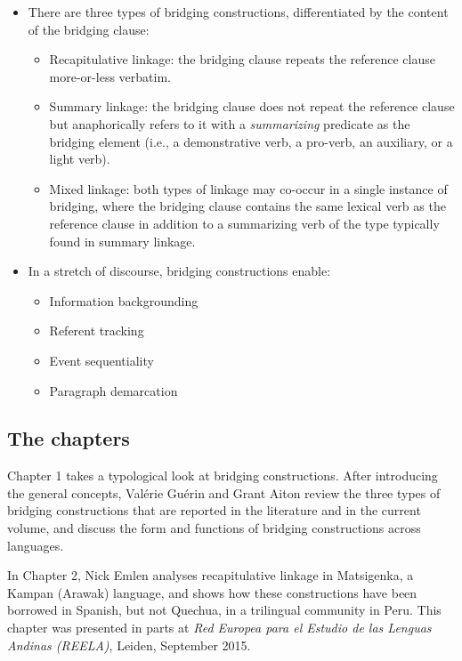 \begin{refsection}
 \begin{itemize}  
\item There are three types of bridging constructions, differentiated by the content of the bridging clause: 
\begin{itemize}
\item Recapitulative linkage: the bridging clause repeats the reference clause more-or-less verbatim. 
\item  Summary linkage: the bridging clause does not repeat the reference clause but anaphorically refers to it with a \textit{summarizing} predicate as the bridging element (i.e., a demonstrative verb, a pro-verb, an auxiliary, or a light verb). 
\item Mixed linkage: both types of linkage may co-occur in a single instance of bridging, where the bridging clause contains the same lexical verb as the reference clause in addition to a summarizing verb of the type typically found in summary linkage.
\end{itemize}
\end{itemize}

 \begin{itemize} 
\item  In a stretch of discourse, bridging constructions enable:
\begin{itemize}
\item  Information backgrounding
\item  Referent tracking
\item  Event sequentiality 
\item  Paragraph demarcation
\end{itemize}
\end{itemize}


\subsection*{The chapters}

Chapter 1 takes a typological look at bridging constructions. After introducing the general concepts, Valérie Guérin and Grant Aiton review the three types of bridging constructions that are reported in the literature and in the current volume, and discuss the form and functions of bridging constructions across languages. 

In Chapter 2, Nick Emlen analyses recapitulative linkage in Matsigenka, a Kampan (Arawak) language, and shows how these constructions have been borrowed in Spanish, but not Quechua, in a trilingual community in Peru. This chapter was presented in parts at \textit{Red Europea para el Estudio de las Lenguas Andinas (REELA)}, Leiden, September 2015. 


\end{refsection}
